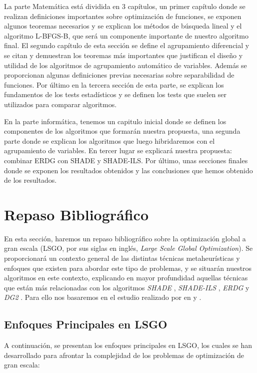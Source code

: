 La parte Matemática está dividida en 3 capítulos, un primer capítulo donde se realizan definiciones importantes sobre optimización de funciones, se exponen algunos teoremas necesarios y se explican los métodos de búsqueda lineal y el algoritmo L-BFGS-B, que será un componente importante de nuestro algoritmo final. El segundo capítulo de esta sección se define el agrupamiento diferencial y se citan y demuestran los teoremas más importantes que justifican el diseño y utilidad de los algoritmos de agrupamiento automático de variables. Además se proporcionan algunas definiciones previas necesarias sobre separabilidad de funciones. Por último en la tercera sección de esta parte, se explican los fundamentos de los tests estadísticos y se definen los tests que suelen ser utilizados para comparar algoritmos. 

En la parte informática, tenemos un capitulo inicial donde se definen los componentes de los algoritmos que formarán nuestra propuesta, una segunda parte donde se explican los algoritmos que luego hibridaremos con el agrupamiento de variables. En tercer lugar se explicará nuestra propuesta: combinar ERDG con SHADE y SHADE-ILS. Por último, unas secciones finales donde se exponen los resultados obtenidos y las conclusiones que hemos obtenido de los resultados.

\chapter{Repaso Bibliográfico}

En esta sección, haremos un repaso bibliográfico sobre la optimización global a gran escala (LSGO, por sus siglas en inglés, \textit{Large Scale Global Optimization}). Se proporcionará un contexto general de las distintas técnicas metaheurísticas y enfoques que existen para abordar este tipo de problemas, y se situarán nuestros algoritmos en este contexto, explicando en mayor profundidad aquellas técnicas que están más relacionadas con los algoritmos \textit{SHADE} \cite{TanabeShade}, \textit{SHADE-ILS} \citep{Molina2018}, \textit{ERDG} \cite{ERDG} y \textit{DG2} \cite{DG2}. Para ello nos basaremos en el estudio realizado por \citeauthor{Review_I} en \cite{Review_I} y \cite{Review_II}.

\section{Enfoques Principales en LSGO}

A continuación, se presentan los enfoques principales en LSGO, los cuales se han desarrollado para afrontar la complejidad de los problemas de optimización de gran escala:

